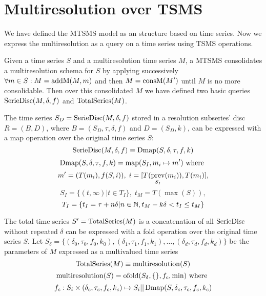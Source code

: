 










\section{Multiresolution over TSMS}
\label{sec:M+TSMS}


We have defined the MTSMS model as an structure based on time
series. Now we express the multiresolution as a query on a time series
using TSMS operations. 

Given a time series $S$ and a multiresolution time series $M$, a MTSMS
consolidates a multiresolution schema for $S$ by applying successively
$\forall m \in S: M=\operatorname{addM}(M,m)$ and then $M=\operatorname{consM}(M')$ until $M$ is
no more consolidable. Then over this consolidated $M$ we have defined
two basic queries $\operatorname{SerieDisc}(M,\delta,f)$ and $\operatorname{TotalSeries}(M)$.

The time series $S_D=\operatorname{SerieDisc}(M,\delta,f)$ stored in a resolution
subseries' disc $R=(B,D)$, where $B=(S_D,\tau,\delta,f)$ and
$D=(S_D,k)$, can be expressed with a map operation over the original
time series $S$:
\[
\operatorname{SerieDisc}(M,\delta,f) \equiv \operatorname{Dmap}(S,\delta,\tau,f,k)
\]
\[
\operatorname{Dmap}(S,\delta,\tau,f,k) = \operatorname*{map}(S_I, m_i\mapsto m') \text{ where }
\]
\[
 m' = (T(m_i), f(S, i)),\;  i = [T(\operatorname*{prev}_{S_I}(m_i)),T(m_i)],
\]
\[
 S_I = \{ (t,\infty) | t\in T_I  \},\;  t_M = T(\max(S)),
\]
\[
T_I = \{ t_I = \tau+n\delta | n\in\mathbb{N}, t_M - k\delta < t_I \leq t_M \}
\]


The total time series $S'=\operatorname{TotalSeries}(M)$ is a concatenation of all
$\operatorname{SerieDisc}$ without repeated $\delta$ can be expressed with a fold
operation over the original time series $S$. Let $S_\delta = \{
(\delta_0,\tau_0,f_0,k_0), (\delta_1,\tau_1,f_1,k_1), \ldots,
(\delta_d,\tau_d,f_d,k_d)\}$ be the parameters of $M$ expressed as a
multivalued time series 
\[
\operatorname{TotalSeries}(M) \equiv \operatorname{multiresolution}(S)
\]
\[
\operatorname{multiresolution}(S) = \operatorname*{ofold}(S_\delta,\{\},f_c,\min) \text{ where }
\]
\[
f_c: S_i \times (\delta_c,\tau_c,f_c,k_c) \mapsto S_i ||
\operatorname{Dmap}(S,\delta_c,\tau_c,f_c,k_c)
\]



